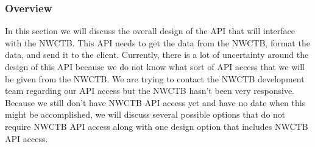 \documentclass[onecolumn, draftclsnofoot,10pt, compsoc]{article}
\begin{document}
		\subsubsection{Overview}
			In this section we will discuss the overall design of the API that will interface with the NWCTB. This API needs to get the data from the NWCTB, format the data, and send it to the client. Currently, there is a lot of uncertainty around the design of this API because we do not know what sort of API access that we will be given from the NWCTB. We are trying to contact the NWCTB development team regarding our API access but the NWCTB hasn't been very responsive. Because we still don't have NWCTB API access yet and have no date when this might be accomplished, we will discuss several possible options that do not require NWCTB API access along with one design option that includes NWCTB API access.\\
			
\end{document}
